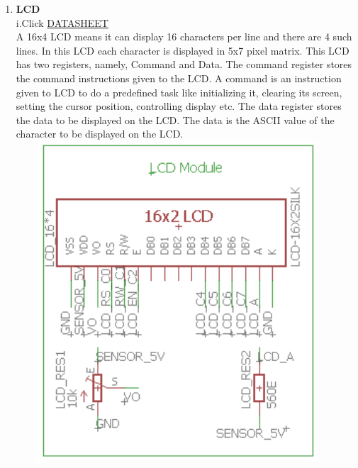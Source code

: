 \documentclass[a4paper,12pt,oneside]{book}
\begin{document}
\begin{enumerate}
     \newpage\item \textbf{LCD}\\
    i.Click \href{http://www.vishay.com/docs/37306/lcd016n004b.pdf}{DATASHEET}
    \\[0.5cm]A 16x4 LCD means it can display 16 characters per line and there are 4 such lines. In this LCD each character is displayed in 5x7 pixel matrix. This LCD has two registers, namely, Command and Data. The command register stores the command instructions given to the LCD. A command is an instruction given to LCD to do a predefined task like initializing it, clearing its screen, setting the cursor position, controlling display etc. The data register stores the data to be displayed on the LCD. The data is the ASCII value of the character to be displayed on the LCD. 
    \\\hfill\includegraphics[width=12cm, height=12cm]{LCD}
    

\end{enumerate}
\end{document}

